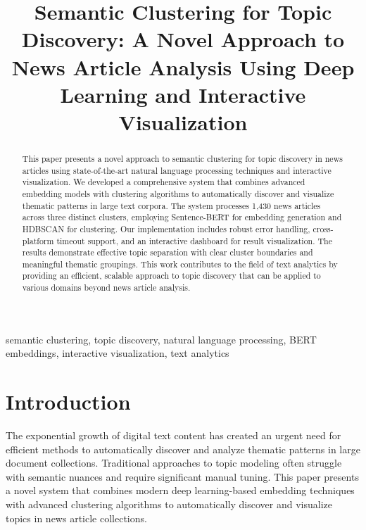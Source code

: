 \documentclass[conference]{IEEEtran}
\begin{document}
\title{Semantic Clustering for Topic Discovery: A Novel Approach to News Article Analysis Using Deep Learning and Interactive Visualization}

\author{
}

\maketitle

\begin{abstract}
This paper presents a novel approach to semantic clustering for topic discovery in news articles using state-of-the-art natural language processing techniques and interactive visualization. We developed a comprehensive system that combines advanced embedding models with clustering algorithms to automatically discover and visualize thematic patterns in large text corpora. The system processes 1,430 news articles across three distinct clusters, employing Sentence-BERT \citep{reimers2019sentence} for embedding generation and HDBSCAN \citep{campello2013density} for clustering. Our implementation includes robust error handling, cross-platform timeout support, and an interactive dashboard for result visualization. The results demonstrate effective topic separation with clear cluster boundaries and meaningful thematic groupings. This work contributes to the field of text analytics by providing an efficient, scalable approach to topic discovery that can be applied to various domains beyond news article analysis.
\end{abstract}

\begin{IEEEkeywords}
semantic clustering, topic discovery, natural language processing, BERT embeddings, interactive visualization, text analytics
\end{IEEEkeywords}

\section{Introduction}
The exponential growth of digital text content has created an urgent need for efficient methods to automatically discover and analyze thematic patterns in large document collections. Traditional approaches to topic modeling often struggle with semantic nuances and require significant manual tuning. This paper presents a novel system that combines modern deep learning-based embedding techniques \citep{devlin2018bert,vaswani2017attention} with advanced clustering algorithms to automatically discover and visualize topics in news article collections.
\end{document}
